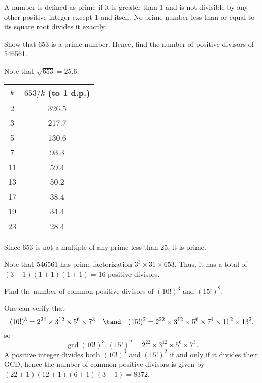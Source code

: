 \begin{problem}
    A number is defined as prime if it is greater than 1 and is not divisible by any other positive integer except 1 and itself. No prime number less than or equal to its square root divides it exactly.

    Show that 653 is a prime number. Hence, find the number of positive divisors of 546561.
\end{problem}
\begin{solution}
    Note that $\sqrt{653} = 25.6$.

    \begin{table}[H]
    \centering
        \begin{tabular}{|c|c|}
        \hline
        $k$ & $653/k$ (to 1 d.p.) \\ \hline
        2 & 326.5 \\ \hline
        3 & 217.7 \\ \hline
        5 & 130.6 \\ \hline
        7 & 93.3 \\ \hline
        11 & 59.4 \\ \hline
        13 & 50.2 \\ \hline
        17 & 38.4 \\ \hline
        19 & 34.4 \\ \hline
        23 & 28.4 \\ \hline
        \end{tabular}
    \end{table}
    
    Since 653 is not a multiple of any prime less than 25, it is prime.

    Note that 546561 has prime factorization $3^3 \times 31 \times 653$. Thus, it has a total of $(3+1)(1+1)(1+1) = 16$ positive divisors.
\end{solution}

\begin{problem}
    Find the number of common positive divisors of $(10!)^3$ and $(15!)^2$.
\end{problem}
\begin{solution}
    One can verify that \[(10!)^3 = 2^{24} \times 3^{12} \times 5^6 \times 7^3 \quad \tand \quad (15!)^2 = 2^{22} \times 3^{12} \times 5^6 \times 7^4 \times 11^2 \times 13^2,\] so \[\gcd{(10!)^3, (15!)^2} = 2^{22} \times 3^{12} \times 5^6 \times 7^3.\] A positive integer divides both $(10!)^3$ and $(15!)^2$ if and only if it divides their GCD, hence the number of common positive divisors is given by $(22+1)(12+1)(6+1)(3+1) = 8372$.
\end{solution}